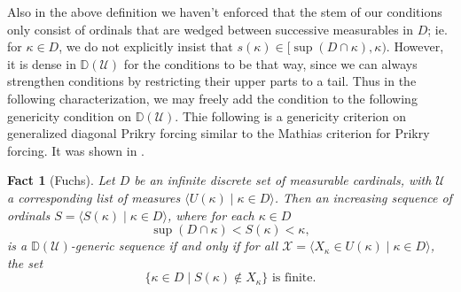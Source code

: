 \documentclass{amsart}
\newtheorem{fact}[theorem]{Fact}
\theoremstyle{definition}
\theoremstyle{remark}
\newcommand{\D}{\mathbb{D}}
\newcommand{\U}{\mathcal{U}}
\begin{document}
Also in the above definition we haven't enforced that the stem of our conditions only consist of ordinals that are wedged between successive measurables in $D$; ie. for $\kappa \in D$, we do not explicitly insist that $s(\kappa) \in [\sup(D\cap \kappa), \kappa)$. However, it is dense in $\D(\U)$ for the conditions to be that way, since we can always strengthen conditions by restricting their upper parts to a tail. Thus in the following characterization, we may freely add the condition to the following genericity condition on $\D(\U)$.
Thie following is a genericity criterion on generalized diagonal Prikry forcing similar to the Mathias criterion for Prikry forcing. It was shown in \cite[Theorem 1]{Fuchs:2005kx}. 

\begin{fact}[Fuchs] \label{fact:diagprikrymathias} Let $D$ be an infinite discrete set of measurable cardinals, with $\U$ a corresponding list of measures $\langle U(\kappa) \;|\; \kappa \in D \rangle$. Then an increasing sequence of ordinals $S = \langle S(\kappa) \;|\; \kappa \in D \rangle$, where for each $\kappa \in D$ $$\sup(D \cap \kappa) < S(\kappa) < \kappa,$$ is a $\D(\U)$-generic  sequence if and only if for all $\mathcal X = \langle X_\kappa \in U(\kappa) \;|\; \kappa \in D \rangle$, the set $$\{ \kappa \in D \;|\; S(\kappa) \notin X_\kappa\} \text{ is finite.}$$
\end{fact}
\end{document}
